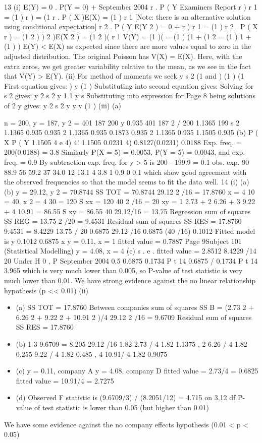 \documentclass[a4paper,12pt]{article}
\begin{document}
13
(i)
E(Y) = 0 . P(Y = 0) +
September 2004
r . P ( Y
Examiners Report
r )
r 1
= (1
)
r ) = (1
r . P ( X
)E(X) = (1
)
r 1
[Note: there is an alternative solution using conditional expectation]
r 2 . P ( Y
E(Y 2 ) = 0 +
r )
r 1
= (1
)
r 2 . P ( X r ) = (1
2 ) ) 2
)E(X 2 ) = (1
2
)(
r 1
V(Y) = (1
)(
= (1
)
(1 +
(1
2
= (1
)
{1 +
(1
)
}
)
E(Y) < E(X) as expected since there are more values equal to zero in the
adjusted distribution.
The original Poisson has V(X) = E(X). Here, with the extra zeros, we get
greater variability relative to the mean, as we see in the fact that V(Y) > E(Y).
(ii)
For method of moments we seek
y
s 2
(1
and
)
(1
) (1
First equation gives:
)
y
(1
)
Substituting into second equation gives:
Solving for
s 2
gives:
y
2
s 2
y
1
1
y
s
Substituting into expression for
Page 8
being solutions of
2
y
gives:
y 2
s 2
y
y
y
(1
)
(iii)
(a)

n = 200, y = 187, y 2 = 401
187
200
y
0.935
401 187 2 / 200
1.1365
199
s 2
1.1365 0.935
0.935 2 1.1365 0.935
0.1873
0.935 2 1.1365 0.935
1.1505
0.935
(b)
P ( X
P ( Y
1.1505 4 e
4)
4!
1.1505
0.0231
4) 0.8127(0.0231) 0.0188
Exp. freq. = 200(0.0188) = 3.8
Similarly
P(X = 5) = 0.0053, P(Y = 5) = 0.0043,
and exp. freq. = 0.9
By subtraction exp. freq. for y > 5 is 200 - 199.9 = 0.1
obs.
exp.
90
88.9
56
59.2
37
34.0
12
13.1
4
3.8
1
0.9
0
0.1
which show good agreement with the observed frequencies so that the
model seems to fit the data well.
14
(i)
(a)
(b)
y = 29.12, y 2 = 70.8744
SS TOT = 70.8744 29.12 2 /16 = 17.8760
x = 4 10 = 40, x 2 = 4 30 = 120
S xx = 120 40 2 /16 = 20
xy = 1 2.73 + 2 6.26 + 3 9.22 + 4 10.91 = 86.55
S xy = 86.55 40 29.12/16 = 13.75
Regression sum of squares SS REG = 13.75 2 /20 = 9.4531
Residual sum of squares SS RES = 17.8760 9.4531 = 8.4229
13.75 / 20 0.6875
29.12 /16 0.6875 (40 /16) 0.1012
Fitted model is y 0.1012 0.6875 x
y = 0.11, x = 1 fitted value = 0.7887
Page 9Subject 101 (Statistical Modelling)
y = 4.08, x = 4
(c)
s . e .
fitted value = 2.8512
8.4229 /14
20
Under H 0 , P
September 2004
0.5
0.6875
0.1734
P t 14
0.6875 / 0.1734
P t 14
3.965
which is very much lower than 0.005, so P-value of test statistic is very
much lower than 0.01.
We have strong evidence against the no linear relationship
hypothesis (p << 0.01)
(ii)
\begin{itemize}
    \item (a)
SS TOT = 17.8760
Between companies sum of squares
SS B = (2.73 2 + 6.26 2 + 9.22 2 + 10.91 2 )/4
29.12 2 /16 = 9.6709
Residual sum of squares SS RES = 17.8760
    \item (b)
1
3
9.6709 = 8.205
29.12 /16 1.82
2.73 / 4 1.82
1.1375 , 2 6.26 / 4 1.82
0.255
9.22 / 4 1.82 0.485 , 4 10.91/ 4 1.82 0.9075
    \item (c) y = 0.11, company A
y = 4.08, company D
fitted value = 2.73/4 = 0.6825
fitted value = 10.91/4 = 2.7275
    \item (d) Observed F statistic is (9.6709/3) / (8.2051/12) = 4.715 on 3,12 df
P-value of test statistic is lower than 0.05 (but higher than 0.01)
\end{itemize}

We have some evidence against the no company effects hypothesis
(0.01 < p < 0.05)
\end{document}
